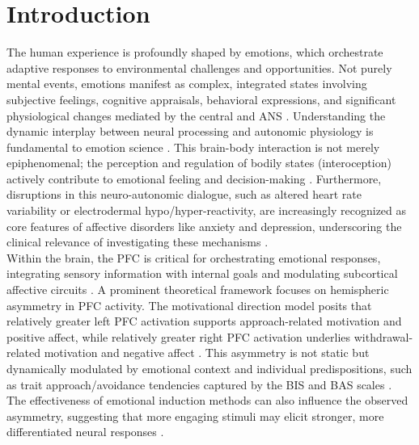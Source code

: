 \documentclass[12pt]{article} %
\begin{document}
\newpage %


\section{Introduction}

The human experience is profoundly shaped by emotions, which orchestrate adaptive responses to environmental challenges and opportunities. Not purely mental events, emotions manifest as complex, integrated states involving subjective feelings, cognitive appraisals, behavioral expressions, and significant physiological changes mediated by the central and \gls{ANS} \parencite{barrettHandbookEmotions2016, kreibigAutonomicNervousSystem2010}. Understanding the dynamic interplay between neural processing and autonomic physiology is fundamental to emotion science \parencite{critchleyNeuralMechanismsAutonomic2005}. This brain-body interaction is not merely epiphenomenal; the perception and regulation of bodily states (interoception) actively contribute to emotional feeling and decision-making \parencite{antoniodamasioDescartesErrorEmotion2005}. Furthermore, disruptions in this neuro-autonomic dialogue, such as altered heart rate variability or electrodermal hypo/hyper-reactivity, are increasingly recognized as core features of affective disorders like anxiety and depression, underscoring the clinical relevance of investigating these mechanisms \parencite{thayerHeartRateVariability2009, beauchaineVagalToneDevelopment2001}.\\

Within the brain, the \gls{PFC} is critical for orchestrating emotional responses, integrating sensory information with internal goals and modulating subcortical affective circuits \parencite{fusterPrefrontalCortex2008}. A prominent theoretical framework focuses on hemispheric asymmetry in \gls{PFC} activity. The motivational direction model posits that relatively greater left \gls{PFC} activation supports approach-related motivation and positive affect, while relatively greater right \gls{PFC} activation underlies withdrawal-related motivation and negative affect \parencite{davidsonWhatDoesPrefrontal2004, harmon-jonesAngerFrontalBrain1996}. This asymmetry is not static but dynamically modulated by emotional context and individual predispositions, such as trait approach/avoidance tendencies captured by the \gls{BIS} and \gls{BAS} scales \parencite{carverBehavioralInhibitionBehavioral1994, suttonPrefrontalBrainAsymmetry1997, rodriguesMindMovementFrontal2018}. The effectiveness of emotional induction methods can also influence the observed asymmetry, suggesting that more engaging stimuli may elicit stronger, more differentiated neural responses \parencite{rodriguesMethodsMatterExamination2021}.\\
\end{document}
